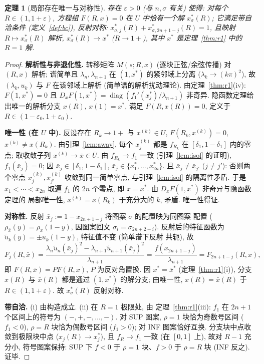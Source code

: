 \documentclass[UTF8]{ctexart}
\newtheorem{theorem}{定理}[section]
\begin{document}
\begin{theorem}[局部存在唯一与对称性]\label{thm:local}
存在 $\varepsilon>0$ (与 $n,\sigma$ 有关) 使得: 对每个 $R\in(1,1+\varepsilon)$,
方程组 $F(R,x)=0$ 在 $U$ 中恰有一个解 $x_\sigma^*(R)$; 它满足带自洽条件
(定义~\ref{def:bc}), 反射对称:
$x_{\sigma,j}^*(R)+x_{\sigma,2n+1-j}^*(R)=1$, 且映射
$R\mapsto x_\sigma^*(R)$ 解析, $x_\sigma^*(R)\to x^*$ ($R\to1+$),
其中 $x^*$ 是定理~\ref{thm:r1} 中的 $R=1$ 解.
\end{theorem}

\begin{proof}
\textbf{解析性与非退化性.} 转移矩阵 $M(s;R,x)$ (逐块正弦/余弦传播) 对
$(R,x)$ 解析; 谱简单且 $\lambda_n,\lambda_{n+1}$ 在 $(1,x^*)$ 的紧邻域上分离
($\lambda_k\to(k\pi)^2$), 故 $(\lambda_k,u_k)$ 与 $F$ 在该邻域上解析
(简单谱的解析扰动理论). 由定理~\ref{thm:r1}(iv): $F(1,x^*)=0$ 且
$D_xF(1,x^*)=\operatorname{diag}(f_1'(x_j^*)/\lambda_{n+1})$ 非奇异.
隐函数定理给出唯一的解析分支 $x(R)$, $x(1)=x^*$, 满足 $F(R,x(R))=0$,
定义于 $R\in(1-\varepsilon_0,1+\varepsilon_0)$.

\textbf{唯一性 (在 $U$ 中).} 反设存在 $R_k\to1+$ 与 $x^{(k)}\in U$,
$F(R_k,x^{(k)})=0$, $x^{(k)}\neq x(R_k)$. 由引理~\ref{lem:away}, 每个
$x_j^{(k)}$ 都是 $f_{R_k}$ 在 $[\delta_1,1-\delta_1]$ 内的零点; 取收敛子列
$x^{(k)}\to\bar x\in\overline U$. 由 $f_{R_k}\to f_1$ 一致 (引理~\ref{lem:isol}
的证明), $f_1(\bar x_j)=0$; 因 $\bar x_j\in[\delta_1,1-\delta_1]$,
$\bar x_j\in\{x_1^*,\dots,x_{2n}^*\}$. 且 $\bar x_j\neq\bar x_{j'}$
($j\neq j'$): 否则两个零点 $x_j^{(k)},x_{j'}^{(k)}$ 收敛到同一简单零点,
与引理~\ref{lem:isol} 的隔离性矛盾. 于是 $\bar x_1<\cdots<\bar x_{2n}$ 取遍
$f_1$ 的 $2n$ 个零点, 即 $\bar x=x^*$. 由 $D_xF(1,x^*)$ 非奇异与隐函数定理的
局部唯一性, $x^{(k)}=x(R_k)$ 于充分大的 $k$, 矛盾. 唯一性得证.

\textbf{对称性.} 反射 $\bar x_j:=1-x_{2n+1-j}$ 将图案 $\sigma$ 的配置映为同图案
配置 ($\rho_{\bar x}(y)=\rho_x(1-y)$, 因图案回文 $\sigma_i=\sigma_{2n+2-i}$).
反射后的特征函数为 $\tilde u_k(y)=\pm u_k(1-y)$, 特征值不变 (简单谱下反射
共轭), 故
\begin{equation*}
	F_j(R,\bar x)=\frac{\lambda_n\tilde u_n(\bar x_j)^2-\lambda_{n+1}\tilde u_{n+1}(\bar x_j)^2}{\lambda_{n+1}}
	=\frac{f(x_{2n+1-j})}{\lambda_{n+1}}=F_{2n+1-j}(R,x),
\end{equation*}
即 $F(R,\bar x)=PF(R,x)$, $P$ 为反对角置换. 因 $x^*=\bar x^*$ (定理~\ref{thm:r1}(i)),
分支 $x(R)$ 与 $\bar x(R)$ 都是通过 $(1,x^*)$ 的解分支; 由唯一性,
$x(R)=\bar x(R)$ 于 $R\in(1,1+\varepsilon)$. 故 $x_\sigma^*(R)$ 反射对称.

\textbf{带自洽.} (i) 由构造成立. (ii) 在 $R=1$ 极限处, 由
定理~\ref{thm:r1}(iii): $f_1$ 在 $2n+1$ 个区间上的符号为 $(-,+,-,\dots,-)$.
对 SUP 图案, $\rho=1$ 块恰为奇数号区间 ($f_1<0$), $\rho=R$ 块恰为偶数号区间
($f_1>0$); 对 INF 图案恰好互换. 分支块中点收敛到极限块中点 ($x_j(R)\to x_j^*$),
且 $f_R\to f_1$ 一致 (在 $[0,1]$ 上), 故对 $R-1$ 充分小, 符号图案保持:
SUP 下 $f<0$ 于 $\rho=1$ 块、$f>0$ 于 $\rho=R$ 块 (INF 反之). 证毕.
\end{proof}
\end{document}
